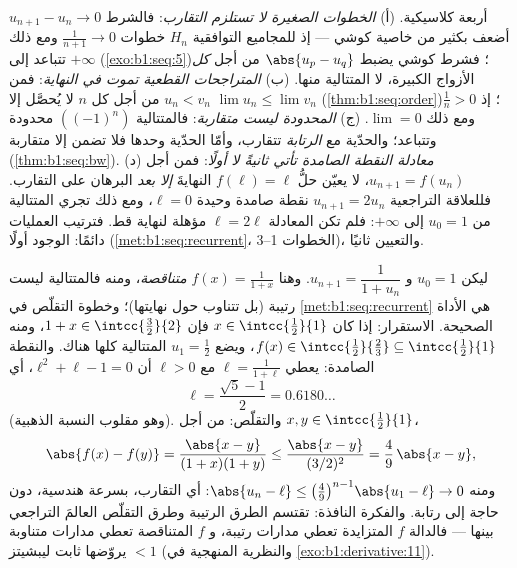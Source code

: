 \begin{remark}
أربعة كلاسيكية. (أ) \emph{الخطوات الصغيرة لا تستلزم التقارب}:
فالشرط $u_{n+1} - u_n \to 0$ أضعف بكثير من خاصية كوشي ---
إذ للمجاميع التوافقية $H_n$ خطوات $\frac{1}{n+1} \to 0$ ومع ذلك
تتباعد إلى $+\infty$ (\cref{exo:b1:seq:5})؛ فشرط كوشي
يضبط $\abs{u_p - u_q}$ من أجل \emph{كل} الأزواج الكبيرة، لا
المتتالية منها. (ب) \emph{المتراجحات القطعية تموت في
النهاية}: فمن $u_n < v_n$ من أجل كل $n$ لا يُحصَّل إلا $\lim u_n
\leq \lim v_n$ (\cref{thm:b1:seq:order})؛ إذ $\frac1n > 0$ ومع ذلك
$\lim = 0$. (ج) \emph{المحدودة ليست متقاربة}: فالمتتالية $((-1)^n)$
محدودة وتتباعد؛ والحدّية مع \emph{الرتابة}
تتقارب، وأمّا الحدّية وحدها فلا تضمن إلا 
متقاربة (\cref{thm:b1:seq:bw}). (د) \emph{معادلة النقطة
الصامدة تأتي ثانيةً لا أولًا}: فمن أجل $u_{n+1} = f(u_n)$،
لا يعيّن حلُّ $f(\ell) = \ell$ النهايةَ \emph{إلا بعد}
البرهان على التقارب. فللعلاقة التراجعية $u_{n+1} = 2u_n$
نقطة صامدة وحيدة $\ell = 0$، ومع ذلك تجري المتتالية من $u_0 = 1$
إلى $+\infty$: فلم تكن المعادلة $\ell = 2\ell$ مؤهلة
لنهاية قط. فترتيب العمليات دائمًا: الوجود
أولًا (\cref{met:b1:seq:recurrent}، الخطوات 1--3)، والتعيين
ثانيًا.
\end{remark}

\begin{example}\label{ex:b1:seq:golden}
ليكن $u_0 = 1$ و $u_{n+1} = \dfrac{1}{1 + u_n}$. وهنا $f(x) =
\frac{1}{1+x}$ \emph{متناقصة}، ومنه فالمتتالية ليست
رتيبة (بل تتناوب حول نهايتها)؛ وخطوة التقلّص
في \cref{met:b1:seq:recurrent} هي الأداة الصحيحة. الاستقرار: إذا كان
$x \in \intcc{\frac12}{1}$ فإن $1 + x \in
\intcc{\frac32}{2}$، ومنه $f(x) \in \intcc{\frac12}{\frac23}
\subseteq \intcc{\frac12}{1}$، ويضع $u_1 = \frac12$ المتتالية
كلها هناك. والنقطة الصامدة: يعطي $\ell = \frac{1}{1+\ell}$
مع $\ell > 0$ أن $\ell^2 + \ell - 1 = 0$، أي
\[
\ell = \frac{\sqrt5 - 1}{2} = 0.6180\dots
\]
(وهو مقلوب النسبة الذهبية). والتقلّص: من أجل $x, y \in
\intcc{\frac12}{1}$،
\[
\abs{f(x) - f(y)} = \frac{\abs{x - y}}{(1+x)(1+y)}
\leq \frac{\abs{x-y}}{(3/2)^2} = \frac49\,\abs{x - y} ,
\]
ومنه $\abs{u_n - \ell} \leq \bigl(\frac49\bigr)^{n-1}\abs{u_1 -
\ell} \to 0$: أي التقارب، بسرعة هندسية، دون
حاجة إلى رتابة. والفكرة النافذة: تقتسم الطرق الرتيبة وطرق
التقلّص العالمَ التراجعي بينها ---
فالدالة $f$ المتزايدة تعطي مدارات رتيبة، و $f$ المتناقصة تعطي
مدارات متناوبة يروّضها ثابت ليبشيتز $< 1$ (والنظرية
المنهجية في \cref{exo:b1:derivative:11}).
\end{example}

